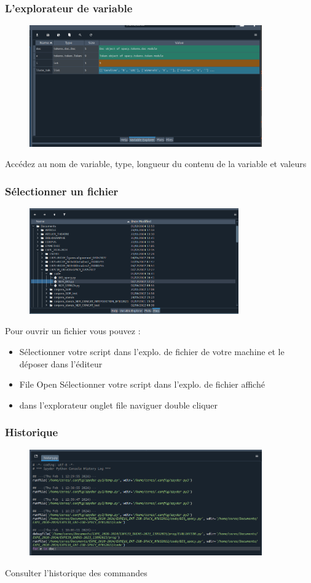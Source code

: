 \begin{frame}  
\frametitle{L'explorateur de variable}
\begin{figure}
  \includegraphics[width=10cm]{images/spyder_explo_variable.png}
  \end{figure}
   Accédez au nom de variable, type, longueur du contenu de la variable et valeurs
\end{frame}

\begin{frame}
  \frametitle{Sélectionner un fichier}
  \begin{figure}
  \includegraphics[width=9cm]{images/spyder_Files.png}
  \end{figure}
  \vspace{-0.3cm}
  Pour ouvrir un fichier vous pouvez :
  \begin{itemize}
  \item {} Sélectionner votre script dans l'explo. de fichier de votre machine et le déposer dans l'éditeur
  \item {} File  Open  Sélectionner votre script dans l'explo. de fichier affiché 
  \item {} dans l'explorateur onglet  file  naviguer  double cliquer
  \end{itemize}
  \end{frame}

\begin{frame}
  \frametitle{Historique}
  \begin{figure}
  \includegraphics[width=10cm]{images/spyder_hystory}
	\end{figure} 
	 Consulter l'historique des commandes  
  \end{frame}
  
